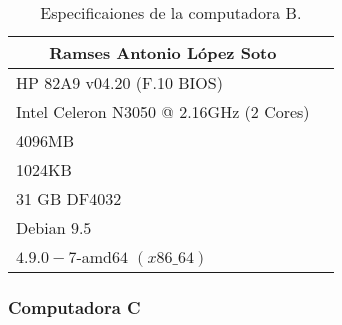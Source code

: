 \documentclass[12pt, letterpaper]{article}
\begin{document}
                                \begin{table}[htb]
                                        \centering
                                        \begin{tabular}{|l|l|}
                                        \hline
                                                \multicolumn{1}{|c|}{Ramses Antonio López Soto} \\ 
                                                \hline \hline
                                                HP 82A9 v04.20 (F.10 BIOS)  \\
                                                Intel Celeron N3050 @ 2.16GHz (2 Cores) \\ 
                                                4096MB \\ 
                                                1024KB \\
                                                31 GB DF4032 \\
                                                Debian $9.5$ \\ 
                                                $4.9.0-7$-amd$64$ $(x86\_64)$ \\ 
                                                \hline
                                        \end{tabular}
                                        \caption{Especificaiones de la computadora B.}
                                \end{table}

                        \subsubsection*{Computadora C}
\end{document}
